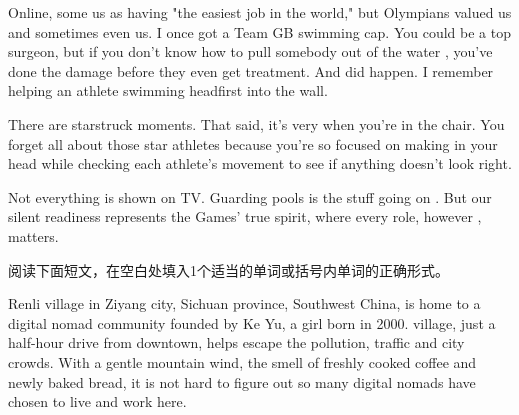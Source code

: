 \documentclass{英语试卷}
\begin{document}
\par Online, some  us as having "the easiest job in the world," but Olympians valued us and sometimes even  us. I once got a Team GB swimming cap. You could be a top surgeon, but if you don't know how to pull somebody out of the water , you've done the damage before they even get treatment. And  did happen. I remember helping an athlete swimming headfirst into the wall.\par
\par There are starstruck moments. That said, it's very  when you're in the chair. You forget all about those star athletes because you're so focused on making  in your head while checking each athlete's movement to see if anything doesn't look right.\par
\par Not everything is shown on TV. Guarding pools is the stuff going on . But our silent readiness represents the Games' true spirit, where every role, however , matters.\par
{}
\par 阅读下面短文，在空白处填入1个适当的单词或括号内单词的正确形式。\par
\par Renli village in Ziyang city, Sichuan province, Southwest China, is home to a digital nomad community founded by Ke Yu, a girl born in 2000.  village, just a half-hour drive from downtown, helps escape the pollution, traffic and city crowds. With a gentle mountain wind, the smell of freshly cooked coffee and newly baked bread, it is not hard to figure out  so many digital nomads have chosen to live and work here.\par
\end{document}
